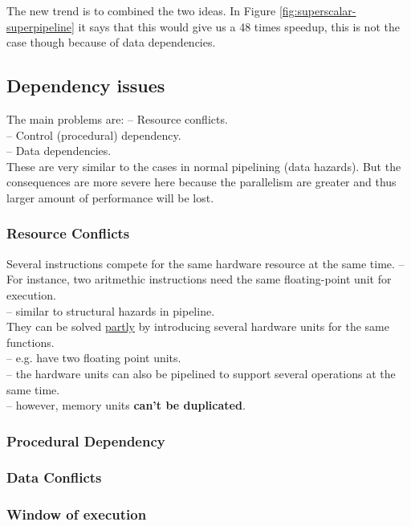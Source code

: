 \documentclass[titlepage, a4paper]{article}
\begin{document}
The new trend is to combined the two ideas. In Figure \ref{fig:superscalar-superpipeline} it says that this would give us a 48 times speedup, this is not the case though because of data dependencies.

\subsection{Dependency issues}
The main problems are:
-- Resource conflicts. \\
-- Control (procedural) dependency. \\
-- Data dependencies. \\

These are very similar to the cases in normal pipelining (data hazards). But the consequences are more severe here because the parallelism are greater and thus larger amount of performance will be lost. \\

\subsubsection{Resource Conflicts}
Several instructions compete for the same hardware resource at the same time.
-- For instance, two aritmethic instructions need the same floating-point unit for execution. \\
-- similar to structural hazards in pipeline. \\

They can be solved \underline{partly} by introducing several hardware units for the same functions. \\
-- e.g. have two floating point units. \\
-- the hardware units can also be pipelined to support several operations at the same time. \\
-- however, memory units \textbf{can't be duplicated}.

\subsubsection{Procedural Dependency}

\subsubsection{Data Conflicts}

\subsubsection{Window of execution}
\end{document}
